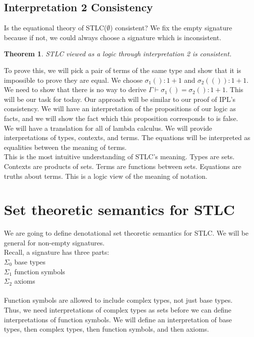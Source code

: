 \documentclass[12pt]{article}
\newtheorem{theorem}{Theorem}
\begin{document}
\subsection{Interpretation 2 Consistency}
Is the equational theory of STLC($\emptyset$) consistent? We fix the empty signature because if not, we could always choose a signature which is inconsistent. 
\begin{theorem} STLC viewed as a logic through interpretation 2 is consistent.
\end{theorem}
To prove this, we will pick a pair of terms of the same type and show that it is impossible to prove they are equal. We choose $\sigma_1() : 1 + 1$  and $\sigma_2(()) : 1 + 1$. We need to show that there is no way to derive $\Gamma \vdash \sigma_1() = \sigma_2() : 1 + 1$. This will be our task for today. Our approach will be similar to our proof of IPL's consistency. We will have an interpretation of the propositions of our logic as facts, and we will show the fact which this proposition corresponds to is false.\\

We will have a translation for all of lambda calculus. We will provide interpretations of types, contexts, and terms. The equations will be interpreted as equalities between the meaning of terms. \\

This is the most intuitive understanding of STLC's meaning. Types are sets. Contexts are products of sets. Terms are functions between sets. Equations are truths about terms. This is a logic view of the meaning of notation. \\

\section{Set theoretic semantics for STLC}
We are going to define denotational set theoretic semantics for STLC. We will be general for non-empty signatures. \\

Recall, a signature has three parts: \\
$\Sigma_0$ base types \\
$\Sigma_1$ function symbols \\
$\Sigma_2$ axioms \\\\

Function symbols are allowed to include complex types, not just base types. Thus, we need interpretations of complex types as sets before we can define interpretations of function symbols. We will define an interpretation of base types, then complex types, then function symbols, and then axioms. \\
\end{document}
